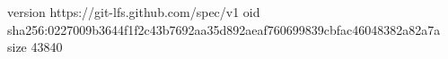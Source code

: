 version https://git-lfs.github.com/spec/v1
oid sha256:0227009b3644f1f2c43b7692aa35d892aeaf760699839cbfac46048382a82a7a
size 43840
